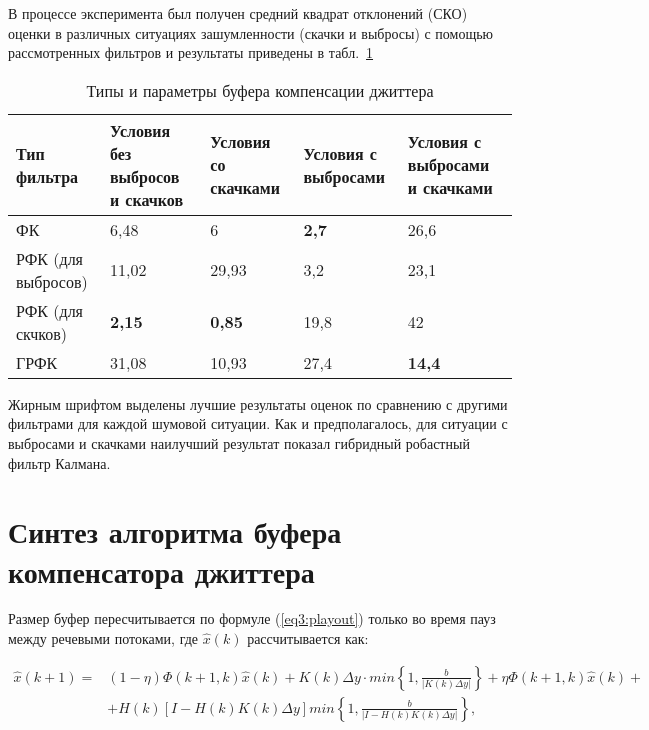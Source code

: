В процессе эксперимента был получен средний квадрат отклонений (СКО) оценки в различных ситуациях зашумленности (скачки и выбросы) с помощью рассмотренных фильтров и результаты приведены в табл. \ref{fkDiffSit}



\begin{table} [htbp]
  \centering
  \parbox{15cm}{\caption{Типы и параметры буфера компенсации джиттера}\label{fkDiffSit}}
\begin{tabular}{|p{3cm}|p{3cm}|p{3cm}|p{3cm}|p{3cm}|}
    \hline
    Тип фильтра        & Условия без выбросов и скачков & Условия со скачками & Условия с выбросами & Условия с выбросами и скачками \\ \hline
    ФК                 & 6,48                           & 6                   & \textbf{2,7}                 & 26,6                           \\ \hline
    РФК (для выбросов) & 11,02                          & 29,93               & 3,2                 & 23,1                           \\ \hline
    РФК (для скчков)   & \textbf{2,15}                           & \textbf{0,85}                & 19,8                & 42                             \\ \hline
    ГРФК               & 31,08                          & 10,93               & 27,4                & \textbf{14,4}                           \\ \hline
    \end{tabular}
\end{table}








Жирным шрифтом выделены лучшие результаты оценок по сравнению с другими фильтрами для каждой шумовой ситуации. Как и предполагалось, для ситуации с выбросами и скачками наилучший результат показал гибридный робастный фильтр Калмана.
\clearpage

\section{Синтез алгоритма буфера компенсатора джиттера} \label{sect3_5}

Размер буфер пересчитывается по формуле (\ref{eq3:playout}) только во время пауз между речевыми потоками, где $\hat{x}(k)$ рассчитывается как:

\begin{equation}\label{eq3:syntes1}
\begin{split}
\hat{x}(k+1)=&(1-\eta) \Phi(k+1,k)\hat{x}(k)+K(k)\Delta y\cdot min\left\{1,\frac{b}{|K(k)\Delta y|}\right\}+\eta \Phi(k+1,k)\hat{x}(k)+\\
&+H(k)[I-H(k)K(k)\Delta y] min\left\{1,\frac{b}{|I-H(k)K(k)\Delta y|}\right\},
\end{split}
\end{equation}

